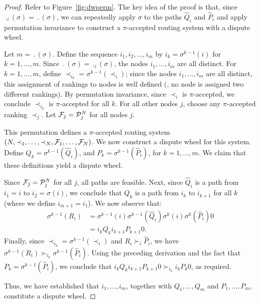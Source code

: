 \begin{proof}
Refer to Figure~\ref{fig:dwperm}. The key idea of the
proof is that, since $\period_i(\sigma) = \period(\sigma)$, we can
repeatedly apply $\sigma$ to the paths $\hat{Q}_i$ and $\hat{P}_i$ and
apply permutation invariance to construct a $\pi$-accepted routing
system with a dispute wheel.

Let $m = \period(\sigma)$.  Define the sequence $i_1, i_2,
\ldots, i_m$ by $i_k = \sigma^{k-1}(i)$ for $k = 1,\ldots,m$.  
Since $\period(\sigma) = \period_i(\sigma)$, the nodes
$i_1,\ldots,i_m$ are all distinct.  For $k = 1,\ldots,m$, define
$\prec_{i_k} = \sigma^{k-1}(\prec_i)$; since the nodes $i_1, \ldots,
i_m$ are all distinct, this assignment of rankings to
nodes is well defined (\ie, no node is assigned two different
rankings).  By permutation
invariance, since $\prec_i$ is $\pi$-accepted, we conclude
$\prec_{i_k}$ is $\pi$-accepted for all $k$.  For all other nodes
$j$, choose any $\pi$-accepted ranking $\prec_j$.  Let
$\mathcal{F}_j = \mathcal{P}_j^N$ for all nodes $j$.

This permutation defines a $\pi$-accepted routing system $(N, \prec_1, \ldots,
\prec_N, \mathcal{F}_1, \ldots, \mathcal{F}_N)$.  We now construct a dispute wheel for
this system.  Define $Q_k = \sigma^{k-1}(\hat{Q}_i)$, and $P_k =
\sigma^{k-1}(\hat{P}_i)$, for $k = 1, \ldots, m$.  We claim that these
definitions yield a dispute wheel.

Since $\mathcal{F}_j = \mathcal{P}_j^N$ for all $j$, all paths are feasible.  Next,
since $\hat{Q}_i$ is a path from $i_1 = i$ to $i_2 = \sigma(i)$, we conclude
that $Q_k$ is a path from $i_k$ to $i_{k+1}$ for all $k$ (where we
define $i_{m+1} = i_1$).  We now observe that:
\begin{align*}
\sigma^{k-1}(R_i) & = \sigma^{k-1}(i) \sigma^{k-1}(\hat{Q}_i) \sigma^{k}(i)
\sigma^{k}(\hat{P}_i) 0 \\
& = i_k Q_{k} i_{k+1}
P_{k+1} 0.
\end{align*}
Finally, since $\prec_{i_k} = \sigma^{k-1}(\prec_i)$ and $R_i \succ_i
\hat{P}_i$, we have $\sigma^{k-1}(R_i) \succ_{i_k}
\sigma^{k-1}(\hat{P}_i)$.  Using the preceding derivation and the fact
that $P_k = \sigma^{k-1}(\hat{P}_i)$, we conclude that $i_k Q_k
i_{k+1} P_{k+1} 0 \succ_{i_k} i_k P_k 0$, as required.

Thus, we have established that $i_1, \ldots, i_m$, together with
$Q_1, \ldots, Q_m$ and $P_1, \ldots,
P_m$, constitute a dispute wheel.
\end{proof}


